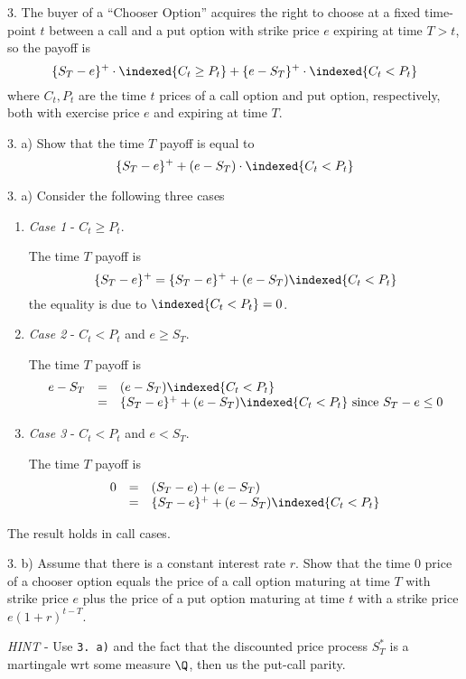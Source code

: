 \documentclass[11pt,a4paper]{article}
\begin{document}
\begin{question}{3.}
  The buyer of a ``Chooser Option'' acquires the right to choose at a fixed time-point $t$ between a call and a put option with strike price $e$ expiring at time $T>t$, so the payoff is
  \[ \{S_T-e\}^+\cdot\indexed\{C_t\geq P_t\}+\{e-S_T\}^+\cdot\indexed\{C_t<P_t\} \]
  where $C_t,P_t$ are the time $t$ prices of a call option and put option, respectively, both with exercise price $e$ and expiring at time $T$.
\end{question}

\begin{question}{3. a)}
  Show that the time $T$ payoff is equal to
  \[ \{S_T-e\}^++(e-S_T)\cdot\indexed\{C_t<P_t\} \]
\end{question}

\begin{answer}{3. a)}
  Consider the following three cases
  \begin{enumerate}
    \item \textit{Case 1} - $C_t\geq P_t$.
    \par The time $T$ payoff is
    \[ \{S_T-e\}^+=\{S_T-e\}^++(e-S_T)\indexed\{C_t<P_t\} \]
    the equality is due to $\indexed\{C_t<P_t\}=0$.
    \item \textit{Case 2} - $C_t<P_t$ and $e\geq S_T$.
    \par The time $T$ payoff is
    \[\begin{array}{rcl}
      e-S_T&=&(e-S_T)\indexed\{C_t<P_t\}\\
      &=&\{S_T-e\}^++(e-S_T)\indexed\{C_t<P_t\}\text{ since }S_T-e\leq0
    \end{array}\]
    \item \textit{Case 3} - $C_t<P_t$ and $e<S_T$.
    \par The time $T$ payoff is
    \[\begin{array}{rcl}
      0&=&(S_T-e)+(e-S_T)\\
      &=&\{S_T-e\}^++(e-S_T)\indexed\{C_t<P_t\}
    \end{array}\]
  \end{enumerate}
  The result holds in call cases.
\end{answer}

\begin{question}{3. b)}
  Assume that there is a constant interest rate $r$. Show that the time 0 price of a chooser option equals the price of a call option maturing at time $T$ with strike price $e$ plus the price of a put option maturing at time $t$ with a strike price $e(1+r)^{t-T}$.
  \par \textit{HINT} - Use \texttt{3. a)}  and the fact that the discounted price process $S_T^*$ is a martingale wrt some measure $\Q$, then us the put-call parity.
\end{question}
\end{document}
